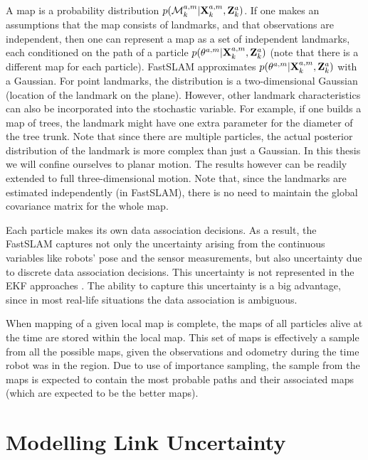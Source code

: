 A map is a probability distribution
$p(\map{k}{a}{m}|\Xall{k}{a}{m},\Zall{k}{a})$. If one makes an
assumptions that the map consists of landmarks, and that observations
are independent, then one can represent a map as a set of independent
landmarks, each conditioned on the path of a particle
$p(\mape{a}{m}{}|\Xall{k}{a}{m},\Zall{k}{a})$ (note that there is a
different map for each particle). FastSLAM approximates
$p(\mape{a}{m}{}|\Xall{k}{a}{m},\Zall{k}{a})$ with a Gaussian.  For
point landmarks, the distribution is a two-dimensional Gaussian
(location of the landmark on the plane). However, other landmark
characteristics can also be incorporated into the stochastic
variable. For example, if one builds a map of trees, the landmark
might have one extra parameter for the diameter of the tree trunk.
Note that since there are multiple particles, the actual posterior
distribution of the landmark is more complex than just a Gaussian. In
this thesis we will confine ourselves to planar motion. The
results however can be readily extended to full three-dimensional motion. Note
that, since the landmarks are estimated independently (in FastSLAM),
there is no need to maintain the global covariance matrix for the
whole map.

Each particle makes its own data association decisions. As a result,
the FastSLAM captures not only the uncertainty arising from the
continuous variables like robots' pose and the sensor measurements,
but also uncertainty due to discrete data association decisions.  This
uncertainty is not represented in the EKF approaches \cite{ekf_slam}.
The ability to capture this uncertainty is a big advantage, since in
most real-life situations the data association is ambiguous.

When mapping of a given local map is complete, the maps of all
particles alive at the time are stored within the local map. This set
of maps is effectively a sample from all the possible maps, given the
observations and odometry during the time robot was in the region.
Due to use of importance sampling, the sample from the maps is
expected to contain the most probable paths and their associated maps
(which are expected to be the better maps).

\section{Modelling Link Uncertainty}
\label{sec:link}

